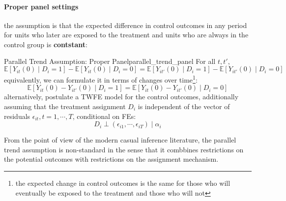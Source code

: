\documentclass[twoside]{article}
\begin{document}
\paragraph*{Proper panel settings} the assumption is that the expected difference in control outcomes in any period for units who later are exposed to the treatment and units who are always in the control group is \textbf{contstant}:
\begin{assumption}{Parallel Trend Assumption: Proper Panel}{parallel_trend_panel}
    For all $t,t'$,
    \begin{equation*}
        \mathbb{E}\left[Y_{it}\left(0\right)\mid D_i=1\right] - \mathbb{E}\left[Y_{it}\left(0\right)\mid D_i=0\right] = \mathbb{E}\left[Y_{it'}\left(0\right)\mid D_i=1\right] - \mathbb{E}\left[Y_{it'}\left(0\right)\mid D_i=0\right]
    \end{equation*}
    equivalently, we can formulate it in terms of changes over time\footnote{the expected change in control outcomes is the same for those who will eventually be exposed to the treatment and those who will not}:
    \begin{equation*}
        \mathbb{E}\left[Y_{it}(0)-Y_{it'}(0)\mid D_i=1\right] = \mathbb{E}\left[Y_{it}(0)-Y_{it'}(0)\mid D_i=0\right]
    \end{equation*}
    alternatively, postulate a TWFE model for the control outcomes, additionally assuming that the treatment assignment $D_i$ is independent of the vector of residuals $\epsilon_{it},t=1,\cdots,T$, conditional on FEs: 
    \begin{equation*}
        D_i \perp \left(\epsilon_{i1},\cdots,\epsilon_{iT}\right) \mid \alpha_i 
    \end{equation*}
\end{assumption}
From the point of view of the modern casual inference literature, the parallel trend assumption is non-standard in the sense that it combbines restrictions on the potential outcomes with restrictions on the assignment mechanism.
\end{document}
